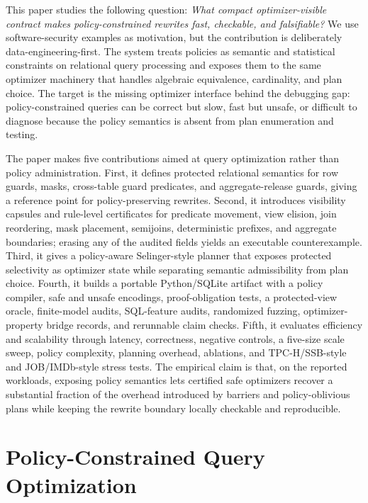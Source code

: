 \documentclass[conference]{IEEEtran}
\begin{document}
This paper studies the following question: \emph{What compact optimizer-visible contract makes policy-constrained rewrites fast, checkable, and falsifiable?} We use software-security examples as motivation, but the contribution is deliberately data-engineering-first. The system treats policies as semantic and statistical constraints on relational query processing and exposes them to the same optimizer machinery that handles algebraic equivalence, cardinality, and plan choice. The target is the missing optimizer interface behind the debugging gap: policy-constrained queries can be correct but slow, fast but unsafe, or difficult to diagnose because the policy semantics is absent from plan enumeration and testing.

The paper makes five contributions aimed at query optimization rather than policy administration. First, it defines protected relational semantics for row guards, masks, cross-table guard predicates, and aggregate-release guards, giving a reference point for policy-preserving rewrites. Second, it introduces visibility capsules and rule-level certificates for predicate movement, view elision, join reordering, mask placement, semijoins, deterministic prefixes, and aggregate boundaries; erasing any of the \CapsuleFieldsTested{} audited fields yields an executable counterexample. Third, it gives a policy-aware Selinger-style planner that exposes protected selectivity as optimizer state while separating semantic admissibility from plan choice. Fourth, it builds a portable Python/SQLite artifact with a policy compiler, safe and unsafe encodings, proof-obligation tests, a protected-view oracle, finite-model audits, SQL-feature audits, randomized fuzzing, optimizer-property bridge records, and rerunnable claim checks. Fifth, it evaluates efficiency and scalability through latency, correctness, negative controls, a five-size scale sweep, policy complexity, planning overhead, ablations, and TPC-H/SSB-style and JOB/IMDb-style stress tests. The empirical claim is that, on the reported workloads, exposing policy semantics lets certified safe optimizers recover a substantial fraction of the overhead introduced by barriers and policy-oblivious plans while keeping the rewrite boundary locally checkable and reproducible.

\section{Policy-Constrained Query Optimization}
\label{sec:problem}
\end{document}
